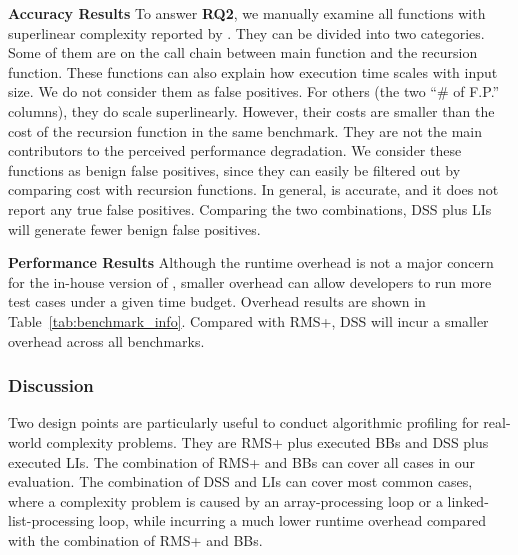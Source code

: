 \textbf{Accuracy Results}
To answer {\bf RQ2},
we manually examine all functions with superlinear complexity reported by \Tool.
They can be divided into two categories. 
Some of them are on the call chain between main function and the recursion function.
These functions can also explain how execution time scales with input size. 
We do not consider them as false positives. 
For others (the two ``\# of F.P.'' columns), they do scale superlinearly. 
However, their costs are smaller than the cost of 
the recursion function in the same benchmark. 
They are not the main contributors to the perceived performance degradation. 
We consider these functions as benign false positives, 
since they can easily be filtered out 
by comparing cost with recursion functions. 
In general, \Tool is accurate, and it does not report any true false positives. 
Comparing the two combinations, DSS plus 
LIs will generate fewer benign false positives. 

\textbf{Performance Results}
Although the runtime overhead is not a major concern 
for the in-house version of \Tool, 
smaller overhead can allow developers to run 
more test cases under a given time budget. 
Overhead results are shown in Table~\ref{tab:benchmark_info}. 
Compared with RMS+, DSS will incur a smaller overhead across all benchmarks. 


\subsubsection{Discussion} 
Two design points are particularly useful 
to conduct algorithmic profiling for real-world complexity problems.
They are RMS+ plus executed BBs and DSS plus executed LIs. 
The combination of RMS+ and BBs can cover all cases in our evaluation. 
The combination of DSS and LIs can cover most common cases, 
where a complexity problem is caused by an array-processing loop or a linked-list-processing loop, 
while incurring a much lower runtime overhead compared with the combination of RMS+ and BBs. 

